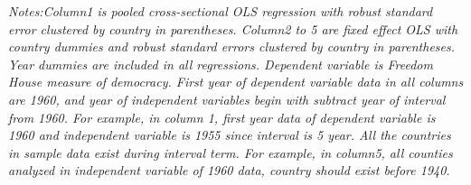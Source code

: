 \begin{table}[h!]
\begin{adjustbox}{max width=\textwidth}
\begin{threeparttable}
\begin{tablenotes}
					    	\item \textit{Notes:Column1 is pooled cross-sectional OLS regression with robust standard error clustered by country in parentheses. Column2 to 5 are fixed effect OLS with country dummies and robust standard errors clustered by country in parentheses. Year dummies are included in all regressions. Dependent variable is Freedom House measure of democracy. First year of dependent variable data in all columns are 1960, and year of independent variables begin with subtract year of interval from 1960. For example, in column 1, first year data of dependent variable is 1960 and independent variable is 1955 since interval is 5 year. All the countries in sample data exist during interval term. For example, in column5, all counties analyzed in independent variable of 1960 data, country should exist before 1940.} 
		\end{tablenotes}
		\end{threeparttable}	
		\end{adjustbox}
	\end{table}

